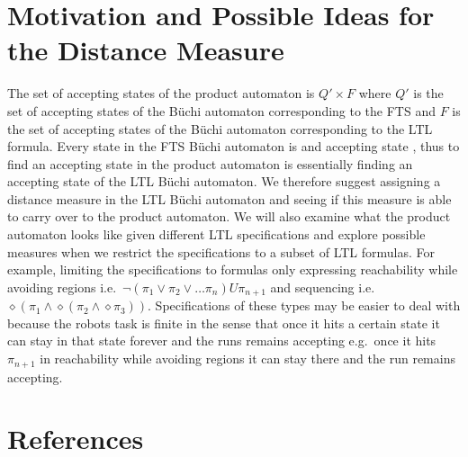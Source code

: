 \documentclass[11pt,a4paper]{article}
\begin{document}
\section{Motivation and Possible Ideas for the Distance Measure}
The set of accepting states of the product automaton is $Q' \times F$ where $Q'$ is the set of accepting states of the B\"{u}chi automaton corresponding to the FTS and $F$ is the set of accepting states of the B\"{u}chi automaton corresponding to the LTL formula. Every state in the FTS B\"{u}chi automaton is and accepting state \cite{clarke99}, thus to find an accepting state in the product automaton is essentially finding an accepting state of the LTL B\"{u}chi automaton. We therefore suggest assigning a distance measure in the LTL B\"{u}chi automaton and seeing if this measure is able to carry over to the product automaton. We will also examine what the product automaton looks like given different LTL specifications and explore possible measures when we restrict the specifications to a subset of LTL formulas. For example, limiting the specifications to formulas only expressing reachability while avoiding regions i.e.\ $\neg(\pi_1 \lor \pi_2 \lor \dots \pi_n)U\pi_{n+1}$ and sequencing i.e.\ $\diamond (\pi_1 \land \diamond (\pi_2 \land \diamond \pi_3))$. Specifications of these types may be easier to deal with because the robots task is finite in the sense that once it hits a certain state it can stay in that state forever and the runs remains accepting e.g.\ once it hits $\pi_{n+1}$ in reachability while avoiding regions it can stay there and the run remains accepting.
%
%


\section{References}




\end{document}
